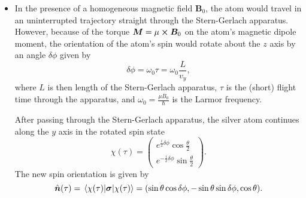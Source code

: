 \documentclass[11pt, a4paper]{article}
\newcommand{\SG}{Stern-Gerlach\xspace}
\renewcommand{\vec}[1]{\bm{#1}}  %
\newcommand{\uvec}[1]{\hat{\vec{#1}}}  %
\newcommand{\B}{\vec{B}}  %
\begin{document}
\begin{itemize}
    \item In the presence of a homogeneous magnetic field $ \B_{0} $, the atom would travel in an uninterrupted trajectory straight through the Stern-Gerlach apparatus. However, because of the torque $ \vec{M} = \mu \cross \B_{0} $ on the atom's magnetic dipole moment, the orientation of the atom's spin would rotate about the $ z $ axis by an angle $ \delta\phi $ given by
    \begin{equation*}
        \delta \phi = \omega_{0} \tau = \omega_{0} \frac{L}{v_{y}},
    \end{equation*}
    where $ L $ is then length of the \SG apparatus, $ \tau $ is the (short) flight time through the apparatus, and $ \omega_{0} = \frac{\mu B_{0}}{\hbar} $ is the Larmor frequency.

   After passing through the \SG apparatus, the silver atom continues along the $ y $ axis in the rotated spin state
    \begin{equation*}
        \chi(\tau) = 
        \begin{pmatrix}
            e^{\frac{i}{2}\delta\phi}\cos \frac{\theta}{2}\\[1mm]
            e^{-\frac{i}{2}\delta\phi}\sin \frac{\theta}{2}
        \end{pmatrix}.
    \end{equation*}
    The new spin orientation is given by
    \begin{equation*}
        \uvec{n}(\tau) = \mel{\chi(\tau)}{\vec{\sigma}}{\chi(\tau)} = (\sin \theta \cos \delta \phi, - \sin \theta \sin \delta \phi, \cos \theta).
    \end{equation*}
    
\end{itemize}
\end{document}
